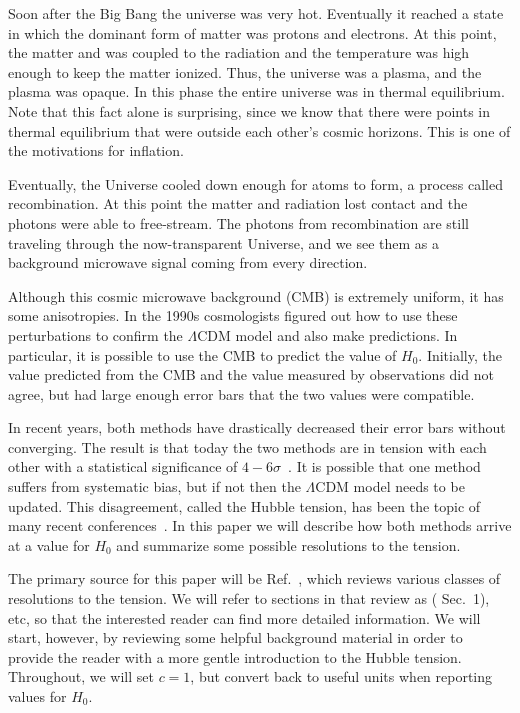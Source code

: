 \documentclass[12pt]{article}
\renewcommand{\L}{$\Lambda$}
\newcommand{\val}[1]{\cite{DiValentino2021} Sec.~#1}
\begin{document}
Soon after the Big Bang the universe was very hot. Eventually it reached a state in which the dominant form of matter was protons and electrons. At this point, the matter and was coupled to the radiation and the temperature was high enough to keep the matter ionized. Thus, the universe was a plasma, and the plasma was opaque.
In this phase the entire universe was in thermal equilibrium. Note that this fact alone is surprising, since we know that there were points in thermal equilibrium that were outside each other's cosmic horizons. This is one of the motivations for inflation. 

Eventually, the Universe cooled down enough for atoms to form, a process called recombination. At this point the matter and radiation lost contact and the photons were able to free-stream. The photons from recombination are still traveling through the now-transparent Universe, and we see them as a background microwave signal coming from every direction.

Although this cosmic microwave background (CMB) is extremely uniform, it has some anisotropies. In the 1990s cosmologists figured out how to use these perturbations to confirm the \L CDM model and also make predictions. In particular, it is possible to use the CMB to predict the value of $H_0$. Initially, the value predicted from the CMB and the value measured by observations did not agree, but had large enough error bars that the two values were compatible. 

In recent years, both methods have drastically decreased their error bars without converging. The result is that today the two methods are in tension with each other with a statistical significance of $4-6\sigma$~\cite{DiValentino2021}. It is possible that one method suffers from systematic bias, but if not then the \L CDM model needs to be updated. This disagreement, called the Hubble tension, has been the topic of many recent conferences~\cite{Verde2019, DiValentino2020}.  In this paper we will describe how both methods arrive at a value for $H_0$ and summarize some possible resolutions to the tension.

The primary source for this paper will be Ref.~\cite{DiValentino2021}, which reviews various classes of resolutions to the tension. We will refer to sections in that review as (\val{1}), etc, so that the interested reader can find more detailed information. We will start, however, by reviewing some helpful background material in order to provide the reader with a more gentle introduction to the Hubble tension. Throughout, we will set $c = 1$, but convert back to useful units when reporting values for $H_0$.
\end{document}
